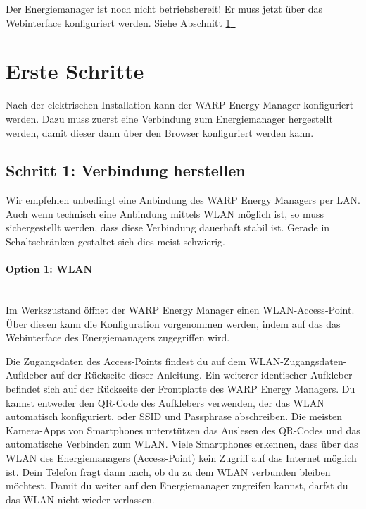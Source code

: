 \documentclass[a4paper,10pt]{article}
\newcommand{\hint}[1]{\begin{tcolorbox}[colback=boxgray,colframe=black,coltext=
white,title=Hinweis,left*=2mm,right*=2mm,boxsep=1mm,bottom=1mm,top=1mm]#1\end{tcolorbox}}
\newcommand*{\fullref}[1]{Abschnitt \hyperref[{#1}]{\ref*{#1}~\nameref*{#1}}}
\begin{document}
\begin{multicols*}{2}
	\hint{Der Energiemanager ist noch nicht betriebsbereit! Er muss jetzt über das Webinterface konfiguriert werden. Siehe \fullref{setup}}

	\vfill
	\null
	\newpage
	\section{Erste Schritte}
	\label{setup}

	Nach der elektrischen Installation kann der WARP Energy Manager konfiguriert
	werden. Dazu muss zuerst eine Verbindung zum Energiemanager hergestellt werden,
	damit dieser dann über den Browser konfiguriert werden kann.

	\subsection{Schritt 1: Verbindung herstellen}


	\hint{Wir empfehlen unbedingt eine Anbindung des WARP Energy Managers per
	LAN. Auch wenn technisch eine Anbindung mittels WLAN möglich ist, so muss
	sichergestellt werden, dass diese Verbindung dauerhaft stabil ist. Gerade in
	Schaltschränken gestaltet sich dies meist schwierig.}

	\paragraph{Option 1: WLAN}\ \\
	Im Werkszustand öffnet der WARP Energy Manager einen WLAN-Access-Point. Über diesen kann
	die Konfiguration vorgenommen werden, indem auf das das Webinterface des
	Energiemanagers zugegriffen wird.

	Die Zugangsdaten des Access-Points findest du auf dem WLAN-Zugangsdaten-Aufkleber
	auf der Rückseite dieser Anleitung. Ein weiterer identischer Aufkleber
	befindet sich auf der Rückseite der Frontplatte des WARP Energy Managers.
	Du kannst entweder den QR-Code des Aufklebers verwenden,
	der das WLAN automatisch konfiguriert, oder SSID und Passphrase abschreiben.
	Die meisten Kamera-Apps von Smartphones unterstützen das Auslesen des
	QR-Codes und das automatische Verbinden zum WLAN. Viele Smartphones
	erkennen, dass über das WLAN des Energiemanagers (Access-Point) kein Zugriff auf das
	Internet möglich ist. Dein Telefon fragt dann nach, ob du zu dem WLAN
	verbunden bleiben möchtest. Damit du weiter auf den Energiemanager zugreifen
	kannst, darfst du das WLAN nicht wieder verlassen.


\end{multicols*}
\end{document}
